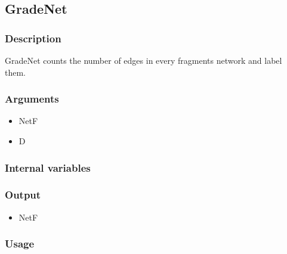 \subsection{GradeNet}
\subsubsection{Description}
GradeNet counts the number of edges in every fragments network and label them.
\subsubsection{Arguments}
\begin{itemize}
\item NetF
\item D
\end{itemize}
\subsubsection{Internal variables}
\subsubsection{Output}
\begin{itemize}
\item NetF
\end{itemize}
\subsubsection{Usage}

